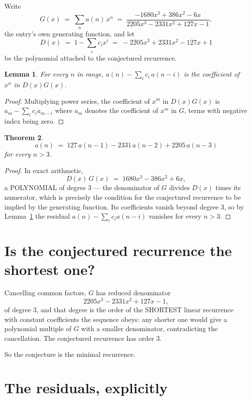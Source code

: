 \documentclass[11pt,a4paper]{article}
\theoremstyle{plain}
\newtheorem{theorem}{Theorem}
\newtheorem{lemma}[theorem]{Lemma}
\theoremstyle{definition}
\begin{document}
Write
\[
G(x)\;=\;\sum_{n}a(n)\,x^{n}\;=\;\frac{- 1680 x^{3} + 386 x^{2} - 6 x}{2205 x^{3} - 2331 x^{2} + 127 x - 1},
\]
the entry's own generating function, and let
\[
D(x)\;=\;1-\sum_i c_i x^{i}\;=\;- 2205 x^{3} + 2331 x^{2} - 127 x + 1
\]
be the polynomial attached to the conjectured recurrence.

\begin{lemma}\label{lem:key}
For every $n$ in range, $a(n)-\sum_i c_i\,a(n-i)$ is the coefficient of $x^{n}$ in
$D(x)G(x)$.
\end{lemma}

\begin{proof}
Multiplying power series, the coefficient of $x^{m}$ in $D(x)G(x)$ is
$a_m-\sum_i c_i a_{m-i}$ where $a_m$ denotes the coefficient of $x^{m}$ in $G$, terms with
negative index being zero.
\end{proof}

\begin{theorem}
\[
a(n)\;=\;127\,a(n-1) - 2331\,a(n-2) + 2205\,a(n-3)
\]
for every $n>3$.
\end{theorem}

\begin{proof}
In exact arithmetic,
\[
D(x)\,G(x)\;=\;1680 x^{3} - 386 x^{2} + 6 x,
\]
a POLYNOMIAL of degree $3$ --- the denominator of $G$ divides $D(x)$ times its numerator,
which is precisely the condition for the conjectured recurrence to be implied by the
generating function. Its coefficients vanish beyond degree $3$, so by
Lemma~\ref{lem:key} the residual $a(n)-\sum_ic_ia(n-i)$ vanishes for every
$n>3$.
\end{proof}

\section{Is the conjectured recurrence the shortest one?}

Cancelling common factors, $G$ has reduced denominator
\[
2205 x^{3} - 2331 x^{2} + 127 x - 1,
\]
of degree $3$, and that degree is the order of the SHORTEST linear recurrence with
constant coefficients the sequence obeys: any shorter one would give a polynomial multiple of
$G$ with a smaller denominator, contradicting the cancellation. The conjectured recurrence has
order $3$.

So the conjecture is the minimal recurrence.

\section{The residuals, explicitly}
\end{document}
